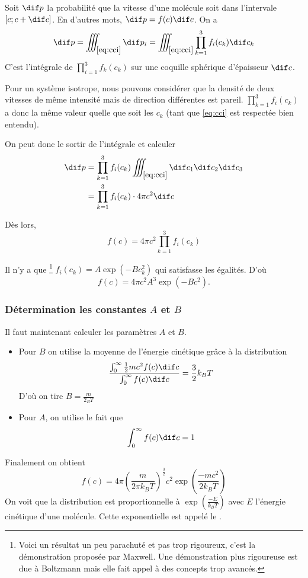 Soit $\dif p$ la probabilité que la vitesse d'une molécule soit
dans l'intervale $[c; c + \dif c]$.
En d'autres mots, $\dif p = f(c) \dif c$.
On a
\[ \dif p
= \iiint_{\eqref{eq:cci}} \dif p_i
= \iiint_{\eqref{eq:cci}} \prod_{k=1}^3 f_i(c_k) \dif c_k \]
C'est l'intégrale de $\prod_{i=1}^3 f_k(c_k)$ sur une coquille sphérique
d'épaisseur $\dif c$.

Pour un système isotrope, nous pouvons considérer que
la densité de deux vitesses de même intensité mais de direction
différentes est pareil.
$\prod_{k=1}^3 f_i(c_k)$ a donc la même valeur
quelle que soit les $c_k$ (tant que \eqref{eq:cci} est respectée bien entendu).

On peut donc le sortir de l'intégrale et calculer
\begin{align*}
  \dif p & = \prod_{k=1}^3 f_i(c_k)
  \iiint_{\eqref{eq:cci}} \dif c_1 \dif c_2 \dif c_3\\
  & = \prod_{k=1}^3 f_i(c_k) \cdot 4\pi c^2 \dif c
\end{align*}

Dès lors,
\[ f(c) = 4\pi c^2 \prod_{k=1}^3 f_i(c_k) \]

Il n'y a que
\footnote{Voici un résultat un peu parachuté et pas trop rigoureux,
c'est la démonstration proposée par Maxwell.
Une démonstration plus rigoureuse est due à Boltzmann
mais elle fait appel à des concepts trop avancés.}
$f_i(c_k) = A \exp(-Bc_k^2)$ qui satisfasse les égalités. D'où
\[ f(c) = 4\pi c^2 A^3 \exp (-Bc^2). \]


\subsubsection{Détermination les constantes $A$ et $B$}
Il faut maintenant calculer les paramètres $A$ et $B$.
\begin{itemize}
  \item Pour $B$ on utilise la moyenne de
    l'énergie cinétique grâce à la distribution
    \[ \frac{\int_0^{\infty}\frac 12 mc^2f(c)\dif c}
      {\int^{\infty}_0 f(c) \dif c}
    = \frac 32k_BT \]
    D'où on tire $B = \frac m{2_BT}$
  \item Pour $A$, on utilise le fait que
    \[ \int_0^{\infty} f(c) \dif c = 1 \]
\end{itemize}
Finalement on obtient
\[ f(c) = 4\pi \left(\frac{m}{2\pi k_BT}\right)^\frac 32
c^2 \exp\left(\frac{-mc^2}{2k_BT}\right) \]
On voit que la distribution est proportionnelle à
$\exp \left(\frac{-E}{k_BT}\right)$ avec $E$ l'énergie cinétique d'une molécule.
Cette exponentielle est appelé le .

